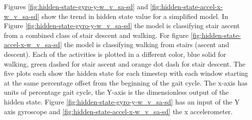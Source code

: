\documentclass[sensors,article,submit,moreauthors,pdftex]{Definitions/mdpi}
\begin{document}
Figures \ref{fig:hidden-state-gyro-y-w_v_sa-sd} and \ref{fig:hidden-state-accel-x-w_v_sa-sd} show the trend in hidden state value for a simplified model. In Figure \ref{fig:hidden-state-gyro-y-w_v_sa-sd} the model is classifying stair ascent from a combined class of stair descent and walking. For figure \ref{fig:hidden-state-accel-x-w_v_sa-sd} the model is classifying walking from stairs (ascent and descent). Each of the activities is plotted in a different color, blue solid for walking, green dashed for stair ascent and orange dot dash for stair descent. The five plots each show the hidden state for each timestep with each window starting at the same percentage offset from the beginning of the gait cycle. The x-axis has units of percentage gait cycle, the Y-axis is the dimensionless output of the hidden state. Figure \ref{fig:hidden-state-gyro-y-w_v_sa-sd} has an input of the Y axis gyroscope and \ref{fig:hidden-state-accel-x-w_v_sa-sd} the x accelerometer.
\end{document}
